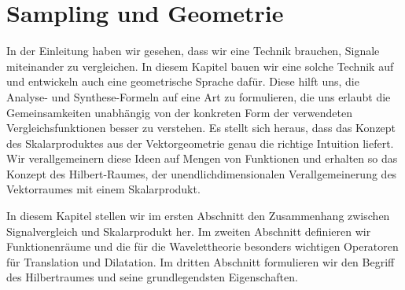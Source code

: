 %
%
%
\chapter{Sampling und Geometrie
\label{chapter:geometrie}}
In der Einleitung haben wir gesehen, dass wir eine Technik brauchen,
Signale miteinander zu vergleichen.
In diesem Kapitel bauen wir eine solche Technik auf und entwickeln
auch eine geometrische Sprache dafür.
Diese hilft uns, die Analyse- und Synthese-Formeln auf eine Art zu formulieren,
die uns erlaubt die Gemeinsamkeiten unabhängig von der konkreten Form
der verwendeten Vergleichsfunktionen besser zu verstehen.
Es stellt sich heraus, dass das Konzept des Skalarproduktes aus der
Vektorgeometrie genau die richtige Intuition liefert.
Wir verallgemeinern diese Ideen auf Mengen von Funktionen
und erhalten so das Konzept des Hilbert-Raumes, der unendlichdimensionalen 
Verallgemeinerung des Vektorraumes mit einem Skalarprodukt.

In diesem Kapitel stellen wir im ersten Abschnitt den Zusammenhang
zwischen Signalvergleich und Skalarprodukt her.
Im zweiten Abschnitt definieren wir Funktionenräume und die für
die Wavelettheorie besonders wichtigen Operatoren für Translation und
Dilatation.
Im dritten Abschnitt formulieren wir den Begriff des Hilbertraumes
und seine grundlegendsten Eigenschaften.





